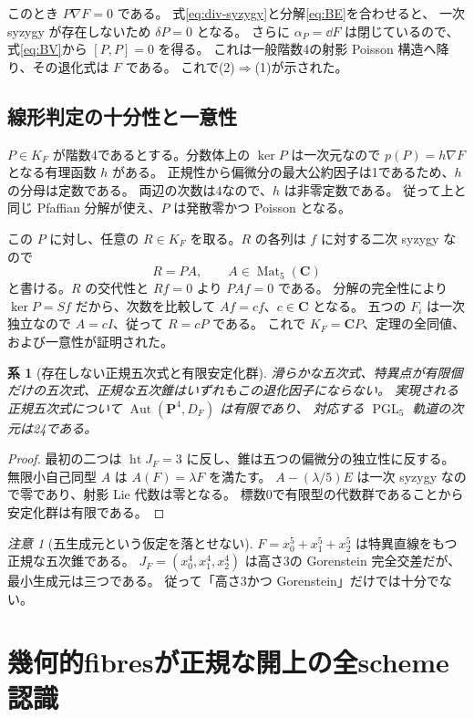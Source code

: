 \documentclass[11pt,a4paper]{ltjsarticle}
\newcommand{\CC}{\mathbf C}\newcommand{\QQ}{\mathbf Q}
\newcommand{\PP}{\mathbf P}\renewcommand{\AA}{\mathbf A}
\DeclareMathOperator{\PGL}{PGL}\DeclareMathOperator{\GL}{GL}
\DeclareMathOperator{\Aut}{Aut}\DeclareMathOperator{\Stab}{Stab}
\newtheorem{corollary}[theorem]{系}
\theoremstyle{remark}\newtheorem{remark}[theorem]{注意}
\begin{document}
このとき $P\nabla F=0$ である。
式\eqref{eq:div-syzygy}と分解\eqref{eq:BE}を合わせると、
一次 syzygy が存在しないため $\delta P=0$ となる。
さらに $\alpha_P=\dd F$ は閉じているので、式\eqref{eq:BV}から $[P,P]=0$ を得る。
これは一般階数4の射影 Poisson 構造へ降り、その退化式は $F$ である。
これで(2)$\Rightarrow$(1)が示された。

\subsection{線形判定の十分性と一意性}

$P\in K_F$ が階数4であるとする。分数体上の $\ker P$ は一次元なので
$p(P)=h\nabla F$ となる有理函数 $h$ がある。
正規性から偏微分の最大公約因子は1であるため、$h$ の分母は定数である。
両辺の次数は4なので、$h$ は非零定数である。
従って上と同じ Pfaffian 分解が使え、$P$ は発散零かつ Poisson となる。

この $P$ に対し、任意の $R\in K_F$ を取る。$R$ の各列は $f$ に対する二次 syzygy なので
\[
                          R=PA,\qquad A\in\operatorname{Mat}_5(\CC)
\]
と書ける。$R$ の交代性と $Rf=0$ より $PAf=0$ である。
分解の完全性により $\ker P=Sf$ だから、次数を比較して $Af=cf$、$c\in\CC$ となる。
五つの $F_i$ は一次独立なので $A=cI$、従って $R=cP$ である。
これで $K_F=\CC P$、定理の全同値、および一意性が証明された。

\begin{corollary}[存在しない正規五次式と有限安定化群]
滑らかな五次式、特異点が有限個だけの五次式、正規な五次錐はいずれもこの退化因子にならない。
実現される正規五次式について $\Aut(\PP^4,D_F)$ は有限であり、
対応する $\PGL_5$ 軌道の次元は24である。
\end{corollary}
\begin{proof}
最初の二つは $\operatorname{ht}J_F=3$ に反し、錐は五つの偏微分の独立性に反する。
無限小自己同型 $A$ は $A(F)=\lambda F$ を満たす。
$A-(\lambda/5)E$ は一次 syzygy なので零であり、射影 Lie 代数は零となる。
標数0で有限型の代数群であることから安定化群は有限である。
\end{proof}

\begin{remark}[五生成元という仮定を落とせない]
$F=x_0^5+x_1^5+x_2^5$ は特異直線をもつ正規な五次錐である。
$J_F=(x_0^4,x_1^4,x_2^4)$ は高さ3の Gorenstein 完全交差だが、最小生成元は三つである。
従って「高さ3かつ Gorenstein」だけでは十分でない。
\end{remark}

\section{幾何的fibresが正規な開上の全scheme認識}
\label{sec:normal-scheme}
\end{document}
